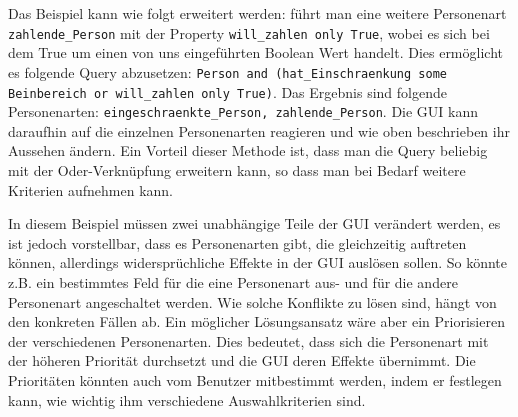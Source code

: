 Das Beispiel kann wie folgt erweitert werden: führt man eine weitere Personenart \lstinline"zahlende_Person" mit der Property \lstinline"will_zahlen only True", wobei es sich bei dem True um einen von uns eingeführten Boolean Wert handelt. Dies ermöglicht es folgende Query abzusetzen: \lstinline"Person and (hat_Einschraenkung some Beinbereich or will_zahlen only True)". Das Ergebnis sind folgende Personenarten: \lstinline"eingeschraenkte_Person, zahlende_Person". Die GUI kann daraufhin auf die einzelnen Personenarten reagieren und wie oben beschrieben ihr Aussehen ändern. Ein Vorteil dieser Methode ist, dass man die Query beliebig mit der Oder-Verknüpfung erweitern kann, so dass man bei Bedarf weitere Kriterien aufnehmen kann.

In diesem Beispiel müssen zwei unabhängige Teile der GUI verändert werden, es ist jedoch vorstellbar, dass es Personenarten gibt, die gleichzeitig auftreten können, allerdings widersprüchliche Effekte in der GUI auslösen sollen. So könnte z.B. ein bestimmtes Feld für die eine Personenart aus- und für die andere Personenart angeschaltet werden. Wie solche Konflikte zu lösen sind, hängt von den konkreten Fällen ab. Ein möglicher Lösungsansatz wäre aber ein Priorisieren der verschiedenen Personenarten. Dies bedeutet, dass sich die Personenart mit der höheren Priorität durchsetzt und die GUI deren Effekte übernimmt. Die Prioritäten könnten auch vom Benutzer mitbestimmt werden, indem er festlegen kann, wie wichtig ihm verschiedene Auswahlkriterien sind.

